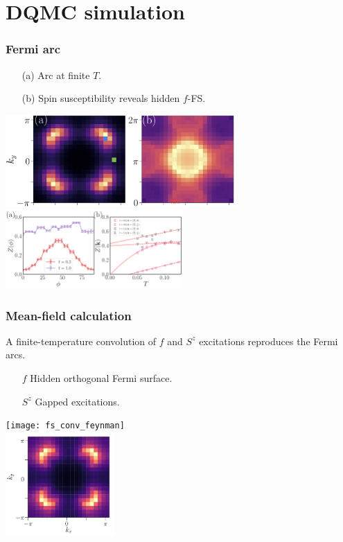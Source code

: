 \documentclass[xcolor=table, 10pt, aspectratio=43]{beamer}
\begin{document}
\section{DQMC simulation}

\begin{frame}
	\frametitle{Fermi arc}
	\begin{itemize}
		\item[(a)] Arc at finite $T$.
		\item[(b)] Spin susceptibility reveals hidden $f$-FS.
	\end{itemize}
	\begin{center}
		\includegraphics[height=3.5cm]{fermi_arc}\\
		\includegraphics[height=3cm]{arc_T}
	\end{center}
\end{frame}

\begin{frame}
  \frametitle{Mean-field calculation}
  A finite-temperature convolution of $f$ and $S^z$ excitations reproduces the Fermi arcs.
  \begin{itemize}
  \item[$f$] Hidden orthogonal Fermi surface.
  \item[$S^z$] Gapped excitations.
  \end{itemize}
  \begin{center}
    \texttt{[image: fs\_conv\_feynman]}\\
    \includegraphics[height=4cm]{arc_mf}
  \end{center}
\end{frame}
\end{document}
